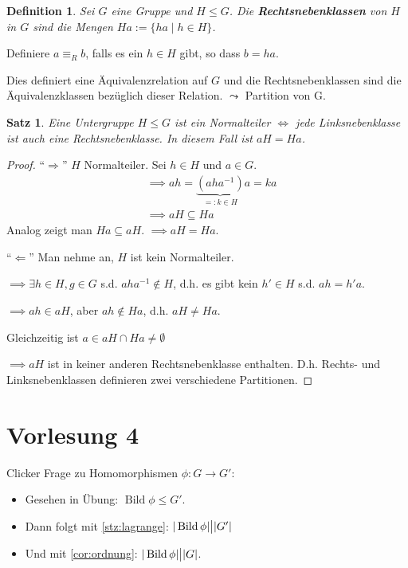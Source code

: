 \documentclass{article}
\theoremstyle{plain}
\newtheorem{definition}{Definition}
\newtheorem{theorem}{Satz}
\newcommand{\bild}{\mathop{\mathrm{Bild}}}
\newcommand{\defn}[1]{\textbf{#1}}
\newcommand{\defeq}{:=}
\newcommand{\ug}{\leq}
\newcommand{\teilt}{\big{|}}
\begin{document}
\begin{definition}
    Sei $G$ eine Gruppe und $H\ug G$. Die \defn{Rechtsnebenklassen} von $H$ in $G$ sind die Mengen $Ha\defeq\{ha\mid h\in H\}$.
\end{definition}

Definiere $a\equiv_R b$, falls es ein $h\in H$ gibt, so dass $b=ha$.

Dies definiert eine Äquivalenzrelation auf $G$ und die Rechtsnebenklassen sind die Äquivalenzklassen bezüglich dieser Relation. $\leadsto$  Partition von G.

\begin{theorem}
    Eine Untergruppe $H\ug G$ ist ein Normalteiler $\Leftrightarrow$ jede Linksnebenklasse ist auch eine Rechtsnebenklasse. In diesem Fall ist $aH=Ha$.
\end{theorem}
\begin{proof}
    ``$\Rightarrow$'' $H$ Normalteiler. Sei $h\in H$ und $a\in G$.
    \begin{align*}
        &\implies ah=\underbrace{(aha^{-1})}_{=:k\in H}a = ka\\
        &\implies aH\subseteq Ha
    \end{align*}
    Analog zeigt man $Ha\subseteq aH$. $\implies aH=Ha$.

    ``$\Leftarrow$'' Man nehme an, $H$ ist kein Normalteiler. 
    
    $\implies \exists h\in H, g\in G$ s.d. $aha^{-1}\notin H$, d.h. es gibt kein $h'\in H$ s.d. $ah=h'a$.
    
    $\implies ah\in aH$, aber $ah\notin Ha$, d.h. $aH\neq Ha$.

    Gleichzeitig ist $a\in aH\cap Ha\neq \emptyset$

    $\implies aH$ ist in keiner anderen Rechtsnebenklasse enthalten. D.h. Rechts- und Linksnebenklassen definieren zwei verschiedene Partitionen.
\end{proof}

\section*{Vorlesung 4}
Clicker Frage zu Homomorphismen $\phi\colon G\to G'$:
\begin{itemize}
    \item Gesehen in Übung: $\bild \phi \ug G'$.
    \item Dann folgt mit \cref{stz:lagrange}: $|\bild \phi|\teilt |G'|$ 
    \item Und mit \cref{cor:ordnung}: $|\bild \phi| \teilt |G|$.
\end{itemize}
\end{document}
